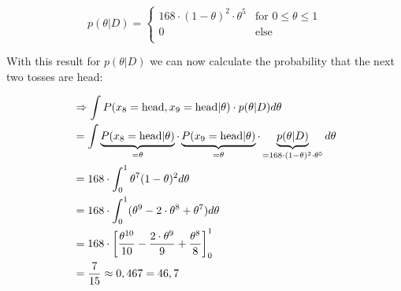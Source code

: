 \begin{center}
        \[p(\theta|D)=\begin{cases}
        168\cdot(1-\theta)^2\cdot\theta^{5}& \text{for } 0\le\theta\le1\\
        0& \text{else} \\
\end{cases}\]
\end{center}

With this result for $p(\theta|D)$ we can now calculate the probability that the next two tosses are head:

\begin{align*}
    &\Rightarrow\int P(x_{8}=\text{head},x_{9}=\text{head}|\theta)\cdot p(\theta|D) d\theta\\
    &=\int \underbrace{P(x_{8}=\text{head}|\theta)}_{=\theta}\cdot \underbrace{P(x_{9}=\text{head}|\theta)}_{=\theta}\cdot \underbrace{p(\theta|D)}_{=168\cdot(1-\theta)^{2}\cdot\theta^{5}} d\theta\\
    &=168\cdot\int_{0}^{1}\theta^{7}(1-\theta)^{2}d\theta\\
    &=168\cdot\int_{0}^{1}(\theta^{9}-2\cdot\theta^{8}+\theta^{7})d\theta\\
    &=168\cdot\left[\frac{\theta^{10}}{10}-\frac{2\cdot\theta^{9}}{9}+\frac{\theta^{8}}{8}\right]_{0}^{1}\\
    &=\frac{7}{15}\approx0,467=46,7\protect
\end{align*}